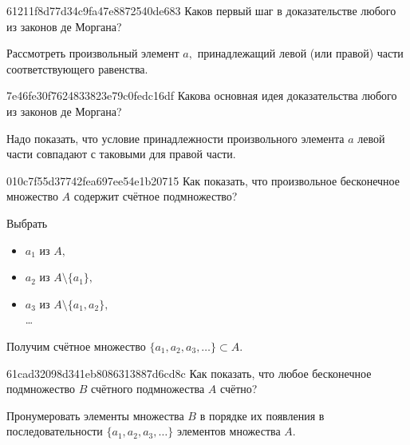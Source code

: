 


    \begin{note}{61211f8d77d34c9fa47e8872540de683}
        Каков первый шаг в доказательстве любого из законов де Моргана?

        \begin{cloze}{1}
            Рассмотреть произвольный элемент \( a, \) принадлежащий левой (или
            правой) части соответствующего равенства.
        \end{cloze}
    \end{note}


    \begin{note}{7e46fe30f7624833823e79c0fedc16df}
        Какова основная идея доказательства любого из законов де Моргана?

        \begin{cloze}{1}
            Надо показать, что условие принадлежности произвольного элемента \( a \)
            левой части совпадают с таковыми для правой части.
        \end{cloze}
    \end{note}

    \begin{note}{010c7f55d37742fea697ee54e1b20715}
        Как показать, что произвольное бесконечное множество \( A \) содержит
        счётное подмножество?

        \begin{cloze}{1}
            Выбрать
            \begin{itemize}
                \item \( a_1 \) из \( A, \)
                \item \( a_2 \) из \( A \setminus \{ a_1 \}, \)
                \item \( a_3 \) из \( A \setminus \{ a_1, a_2 \}, \) \\
                    \dots
            \end{itemize}
            Получим счётное множество \( \{ a_1, a_2, a_3, \ldots \} \subset A.
            \)
        \end{cloze}
    \end{note}

    \begin{note}{61cad32098d341eb8086313887d6cd8c}
        Как показать, что любое бесконечное подмножество \( B \) счётного
        подмножества \( A \) счётно?

        \begin{cloze}{1}
            Пронумеровать элементы множества \( B \) в порядке их появления в
            последовательности \( \{ a_1, a_2, a_3, \ldots  \} \) элементов
            множества \( A. \)
        \end{cloze}
    \end{note}

